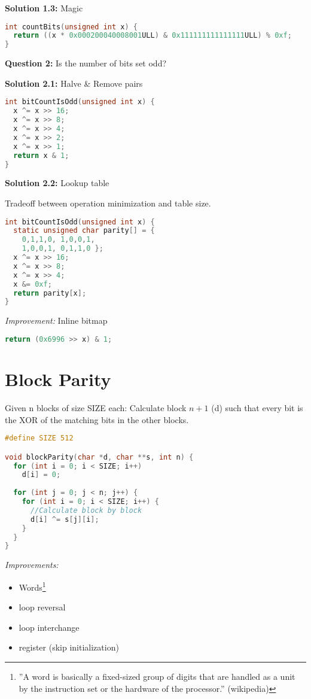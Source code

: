 \textbf{Solution 1.3:} Magic

\begin{lstlisting}[language=C]
int countBits(unsigned int x) { 
  return ((x * 0x000200040008001ULL) & 0x111111111111111ULL) % 0xf; 
}
\end{lstlisting}



\textbf{Question 2:} Is the number of bits set odd?

\textbf{Solution 2.1:} Halve \& Remove pairs
\begin{lstlisting}[language=C]
int bitCountIsOdd(unsigned int x) { 
  x ^= x >> 16; 
  x ^= x >> 8; 
  x ^= x >> 4; 
  x ^= x >> 2; 
  x ^= x >> 1; 
  return x & 1; 
}
\end{lstlisting}

\textbf{Solution 2.2:} Lookup table

Tradeoff between operation minimization and table size.
\begin{lstlisting}[language=C]
int bitCountIsOdd(unsigned int x) { 
  static unsigned char parity[] = { 
    0,1,1,0, 1,0,0,1, 
    1,0,0,1, 0,1,1,0 }; 
  x ^= x >> 16; 
  x ^= x >> 8; 
  x ^= x >> 4; 
  x &= 0xf; 
  return parity[x]; 
}
\end{lstlisting}

\textit{Improvement:} Inline bitmap
\begin{lstlisting}[language=C]
return (0x6996 >> x) & 1; 
\end{lstlisting}





\section{Block Parity}

Given n blocks of size SIZE each: Calculate block $n+1$ (d) such that every bit is the XOR of the matching bits in the other blocks.

\begin{lstlisting}[language=C]
#define SIZE 512

void blockParity(char *d, char **s, int n) { 
  for (int i = 0; i < SIZE; i++)
    d[i] = 0; 
  
  for (int j = 0; j < n; j++) { 
    for (int i = 0; i < SIZE; i++) {
      //Calculate block by block
      d[i] ^= s[j][i]; 
    }
  } 
}
\end{lstlisting}

\textit{Improvements:}
\begin{itemize}
\item Words\footnote{''A word is basically a fixed-sized group of digits that are handled as a unit by the instruction set or the hardware of the processor.'' (wikipedia)}
\item loop reversal
\item loop interchange
\item register (skip initialization)
\end{itemize}

